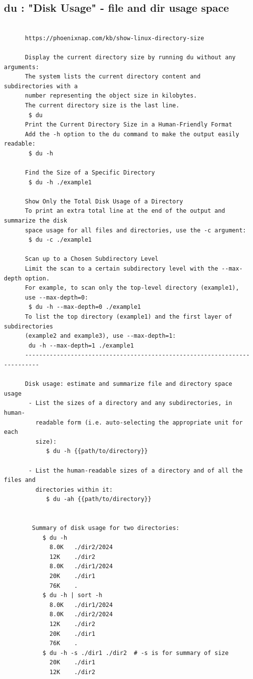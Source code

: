 \documentclass[a4paper,12pt]{article}
\begin{document}
\subsection{du       : "Disk Usage" - file and dir usage space}
\begin{verbatim}
      
      https://phoenixnap.com/kb/show-linux-directory-size
      
      Display the current directory size by running du without any arguments:
      The system lists the current directory content and subdirectories with a    
      number representing the object size in kilobytes. 
      The current directory size is the last line.
       $ du
      Print the Current Directory Size in a Human-Friendly Format
      Add the -h option to the du command to make the output easily readable:
       $ du -h
      
      Find the Size of a Specific Directory
       $ du -h ./example1
      
      Show Only the Total Disk Usage of a Directory
      To print an extra total line at the end of the output and summarize the disk     
      space usage for all files and directories, use the -c argument:
       $ du -c ./example1
      
      Scan up to a Chosen Subdirectory Level
      Limit the scan to a certain subdirectory level with the --max-depth option.     
      For example, to scan only the top-level directory (example1), 
      use --max-depth=0:
       $ du -h --max-depth=0 ./example1
      To list the top directory (example1) and the first layer of subdirectories    
      (example2 and example3), use --max-depth=1:
       du -h --max-depth=1 ./example1
      --------------------------------------------------------------------------
      
      Disk usage: estimate and summarize file and directory space usage
       - List the sizes of a directory and any subdirectories, in human-   
         readable form (i.e. auto-selecting the appropriate unit for each
         size):
            $ du -h {{path/to/directory}}

       - List the human-readable sizes of a directory and of all the files and 
         directories within it:
            $ du -ah {{path/to/directory}}


        Summary of disk usage for two directories:
           $ du -h
             8.0K	./dir2/2024
             12K	./dir2
             8.0K	./dir1/2024
             20K	./dir1
             76K	.
           $ du -h | sort -h
             8.0K	./dir1/2024
             8.0K	./dir2/2024
             12K	./dir2
             20K	./dir1
             76K	.
           $ du -h -s ./dir1 ./dir2  # -s is for summary of size
             20K	./dir1
             12K	./dir2
             

\end{verbatim}
\end{document}
